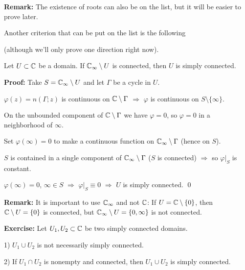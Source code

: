 \documentclass[10pt,aspectratio=169]{beamer}
\begin{document}
\begin{frame}

\textbf{Remark:} The existence of roots can also be on the list, but it will
be easier to prove later.

\medskip
\pause

Another criterion that can be put on the list is the following

(although we'll only prove one direction right now).

\pause

\begin{proposition}
Let $U \subset {\mathbb{C}}$ be a domain.  If
${\mathbb{C}}_\infty \setminus U$ is connected, then $U$ is simply connected.
\end{proposition}

\pause
\medskip

\textbf{Proof:}
Take $S = {\mathbb{C}}_\infty \setminus U$ and let $\Gamma$ be a cycle in $U$.

\medskip
\pause

$\varphi(z)= n(\Gamma;z)$ is continuous on ${\mathbb{C}} \setminus \Gamma$
\pause
\quad $\Rightarrow$ \quad $\varphi$ is continuous on $S \setminus \{ \infty \}$.

\medskip
\pause

On the unbounded component of ${\mathbb{C}} \setminus \Gamma$ we have $\varphi=0$,
so $\varphi=0$ in a neighborhood of $\infty$.

\medskip
\pause

Set $\varphi(\infty) = 0$ to make a continuous function on ${\mathbb{C}}_\infty
\setminus \Gamma$ (hence on $S$).

\medskip
\pause

$S$ is contained in a single component of 
${\mathbb{C}}_\infty \setminus \Gamma$ ($S$ is connected)
\pause \quad $\Rightarrow$ \quad so $\varphi|_S$ is
constant.

\medskip
\pause

$\varphi(\infty) = 0$, $\infty \in S$ \quad $\Rightarrow$ \quad $\varphi|_S \equiv 0$
\pause
\quad $\Rightarrow$ \quad
$U$ is simply connected.
\qed

\medskip
\pause

\textbf{Remark:}
It is important to use ${\mathbb{C}}_\infty$ and not ${\mathbb{C}}$:
\pause
If $U = {\mathbb{C}} \setminus \{ 0 \}$, then
${\mathbb{C}} \setminus U = \{ 0 \}$ is connected, but 
${\mathbb{C}}_\infty \setminus U = \{ 0, \infty \}$ is not connected.
\end{frame}


\begin{frame}

\textbf{Exercise:}
Let $U_1,U_2 \subset {\mathbb{C}}$ be two simply connected domains.

\medskip
\pause

1) $U_1 \cup U_2$ is not necessarily simply connected.

\medskip
\pause

2) If
$U_1 \cap U_2$ is nonempty and connected, then $U_1 \cup U_2$ is simply connected.


\end{frame}
\end{document}
